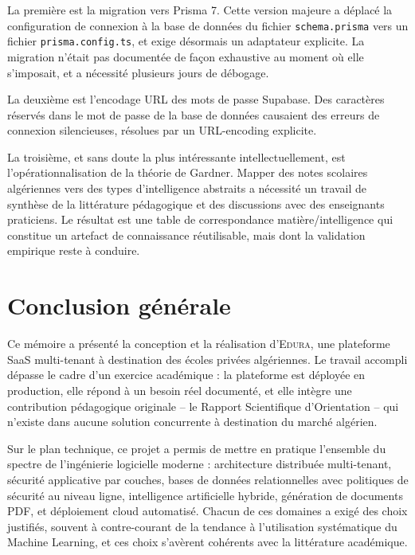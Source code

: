 \documentclass[12pt,a4paper,oneside]{report}
\newcommand{\edura}{\textsc{Edura}}
\begin{document}
La première est la migration vers Prisma 7. Cette version majeure a déplacé la configuration de connexion à la base de données du fichier \texttt{schema.prisma} vers un fichier \texttt{prisma.config.ts}, et exige désormais un adaptateur explicite. La migration n'était pas documentée de façon exhaustive au moment où elle s'imposait, et a nécessité plusieurs jours de débogage.

La deuxième est l'encodage URL des mots de passe Supabase. Des caractères réservés dans le mot de passe de la base de données causaient des erreurs de connexion silencieuses, résolues par un URL-encoding explicite.

La troisième, et sans doute la plus intéressante intellectuellement, est l'opérationnalisation de la théorie de Gardner. Mapper des notes scolaires algériennes vers des types d'intelligence abstraits a nécessité un travail de synthèse de la littérature pédagogique et des discussions avec des enseignants praticiens. Le résultat est une table de correspondance matière/intelligence qui constitue un artefact de connaissance réutilisable, mais dont la validation empirique reste à conduire.

\chapter*{Conclusion générale}

Ce mémoire a présenté la conception et la réalisation d'\edura{}, une plateforme SaaS multi-tenant à destination des écoles privées algériennes. Le travail accompli dépasse le cadre d'un exercice académique : la plateforme est déployée en production, elle répond à un besoin réel documenté, et elle intègre une contribution pédagogique originale -- le Rapport Scientifique d'Orientation -- qui n'existe dans aucune solution concurrente à destination du marché algérien.

\vspace{6pt}
Sur le plan technique, ce projet a permis de mettre en pratique l'ensemble du spectre de l'ingénierie logicielle moderne : architecture distribuée multi-tenant, sécurité applicative par couches, bases de données relationnelles avec politiques de sécurité au niveau ligne, intelligence artificielle hybride, génération de documents PDF, et déploiement cloud automatisé. Chacun de ces domaines a exigé des choix justifiés, souvent à contre-courant de la tendance à l'utilisation systématique du Machine Learning, et ces choix s'avèrent cohérents avec la littérature académique.
\end{document}
